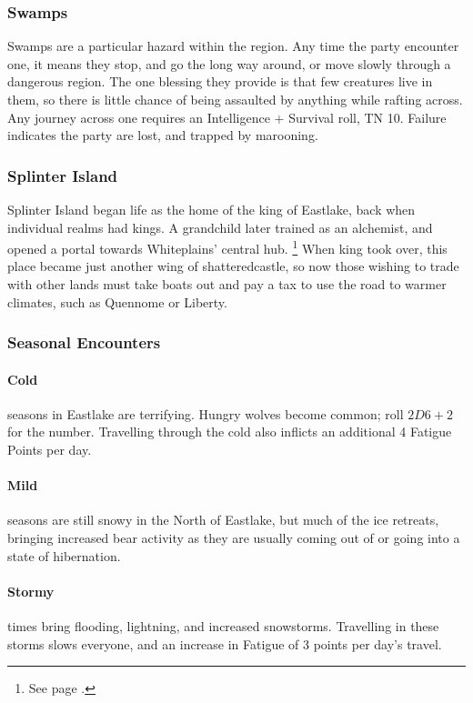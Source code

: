 \begin{multicols}{2}
\subsubsection{Swamps}

Swamps are a particular hazard within the region.
Any time the party encounter one, it means they stop, and go the long way around, or move slowly through a dangerous region.
The one blessing they provide is that few creatures live in them, so there is little chance of being assaulted by anything while rafting across.
Any journey across one requires an Intelligence + Survival roll, TN 10.
Failure indicates the party are lost, and trapped by marooning.

\subsubsection{Splinter Island}

Splinter Island began life as the home of the king of Eastlake, back when individual realms had kings.
A grandchild later trained as an alchemist, and opened a portal towards Whiteplains' central hub.%
\footnote{See page \pageref{whiteland_heart}.}
When \gls{king} took over, this place became just another wing of \gls{shatteredcastle}, so now those wishing to trade with other lands must take boats out and pay a tax to use the road to warmer climates, such as Quennome or Liberty.

\subsubsection{Seasonal Encounters}

\paragraph{Cold} seasons in Eastlake are terrifying.
Hungry wolves become common; roll $2D6 + 2$ for the number.
Travelling through the cold also inflicts an additional 4 Fatigue Points per day.
\paragraph{Mild} seasons are still snowy in the North of Eastlake, but much of the ice retreats, bringing increased bear activity as they are usually coming out of or going into a state of hibernation.
\paragraph{Stormy} times bring flooding, lightning, and increased snowstorms.
Travelling in these storms slows everyone, and an increase in Fatigue of 3 points per day's travel.

\end{multicols}
